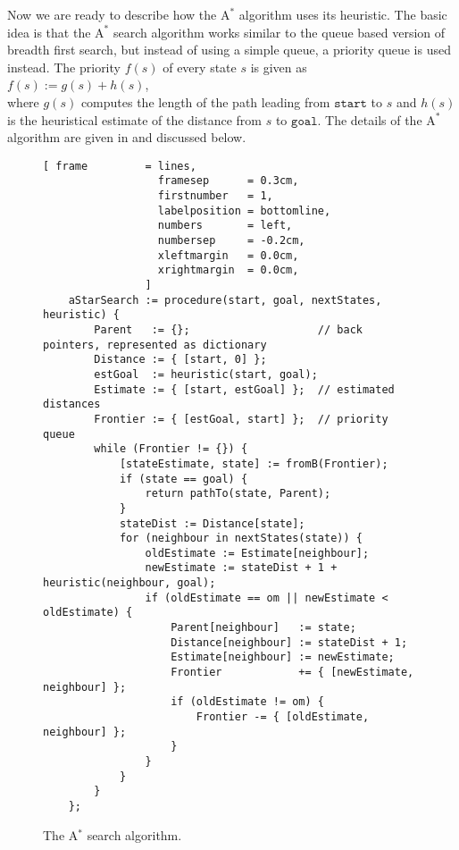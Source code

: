 Now we are ready to describe how the $\mathrm{A}^*$ algorithm uses its heuristic.  The basic idea is that the
$\mathrm{A}^*$ search algorithm works similar to the queue based version of breadth first search, but instead
of using a simple queue, a priority queue is used instead.  The priority $f(s)$ of every state $s$ is given as
\\[0.2cm]
\hspace*{1.3cm}
$f(s) := g(s) + h(s)$,
\\[0.2cm]
where $g(s)$ computes the length of the path leading from $\mathtt{start}$ to $s$ and $h(s)$ is the heuristical
estimate of the distance from $s$ to $\mathtt{goal}$.  The details of the $\mathrm{A}^*$ algorithm are given in
 and discussed below.


\begin{figure}[!ht]
\centering
\begin{Verbatim}[ frame         = lines, 
                  framesep      = 0.3cm, 
                  firstnumber   = 1,
                  labelposition = bottomline,
                  numbers       = left,
                  numbersep     = -0.2cm,
                  xleftmargin   = 0.0cm,
                  xrightmargin  = 0.0cm,
                ]
    aStarSearch := procedure(start, goal, nextStates, heuristic) {
        Parent   := {};                    // back pointers, represented as dictionary
        Distance := { [start, 0] };
        estGoal  := heuristic(start, goal);
        Estimate := { [start, estGoal] };  // estimated distances
        Frontier := { [estGoal, start] };  // priority queue
        while (Frontier != {}) {
            [stateEstimate, state] := fromB(Frontier);
            if (state == goal) {
                return pathTo(state, Parent);
            }
            stateDist := Distance[state];
            for (neighbour in nextStates(state)) {
                oldEstimate := Estimate[neighbour];
                newEstimate := stateDist + 1 + heuristic(neighbour, goal);
                if (oldEstimate == om || newEstimate < oldEstimate) {
                    Parent[neighbour]   := state;
                    Distance[neighbour] := stateDist + 1;
                    Estimate[neighbour] := newEstimate;
                    Frontier            += { [newEstimate, neighbour] };
                    if (oldEstimate != om) {
                        Frontier -= { [oldEstimate, neighbour] };
                    }
                }
            }
        }
    };
\end{Verbatim}
\vspace*{-0.3cm}
\caption{The A$^*$ search algorithm.}
\label{fig:a-star-search.stlx}
\end{figure}
